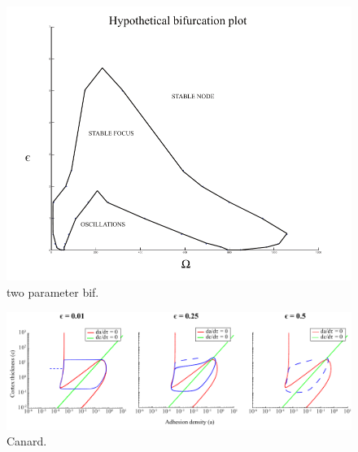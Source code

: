\begin{figure}[h]
\centering
\captionsetup{width=\linewidth}
\includegraphics[width=4.5in]{Project2/figs/Hypothetical_bifurcation_plot.pdf}
\caption{two parameter bif.}
\label{fig::bifplot}
\end{figure}


\begin{figure}[h]
\centering
\captionsetup{width=\linewidth}
\includegraphics[width=4.5in]{Project2/figs/canard.pdf}
\caption{Canard.}
\label{fig::canard}
\end{figure}
